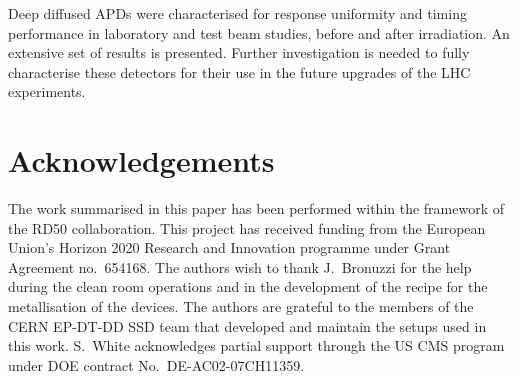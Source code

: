 \documentclass[review,number,sort&compress]{elsarticle}
\begin{document}
Deep diffused APDs were characterised for response uniformity and timing performance in laboratory and test beam studies, before and after irradiation.
An extensive set of results is presented.
Further investigation is needed to fully characterise these detectors for their use in the future upgrades of the LHC experiments.

\section*{Acknowledgements}

The work summarised in this paper has been performed within the framework of the RD50 collaboration.
This project has received funding from the European Union’s Horizon 2020 Research and Innovation programme under Grant Agreement no.\ 654168.
The authors wish to thank J.~Bronuzzi for the help during the clean room operations and in the development of the recipe for the metallisation of the devices.
The authors are grateful to the members of the CERN EP-DT-DD SSD team that developed and maintain the setups used in this work.
S.\ White acknowledges partial support through the US CMS program under DOE contract No.\ DE-AC02-07CH11359.

%
%

\end{document}
